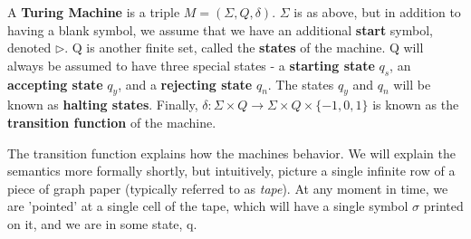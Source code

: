 \begin{definition}
A \textbf{Turing Machine} is a triple $M=(\Sigma,Q,\delta)$. $\Sigma$ is as above, but in addition to having a blank symbol, we assume that we have an additional \textbf{start} symbol, denoted $\triangleright$. Q is another finite set, called the \textbf{states} of the machine. Q will always be assumed to have three special states - a \textbf{starting state} $q_s$, an \textbf{accepting state} $q_y$, and a \textbf{rejecting state} $q_n$. The states $q_y$ and $q_n$ will be known as \textbf{halting states}. Finally, $\delta: \Sigma \times Q \to \Sigma \times Q \times \{-1,0,1\}$ is known as the \textbf{transition function} of the machine. 
\end{definition}
The transition function explains how the machines behavior. We will explain the semantics more formally shortly, but intuitively, picture a single infinite row of a piece of graph paper (typically referred to as \textit{tape}). At any moment in time, we are 'pointed' at a single cell of the tape, which will have a single symbol $\sigma$ printed on it, and we are in some state, q. 
\vspace{1cm}
\begin{center}
\end{center}

